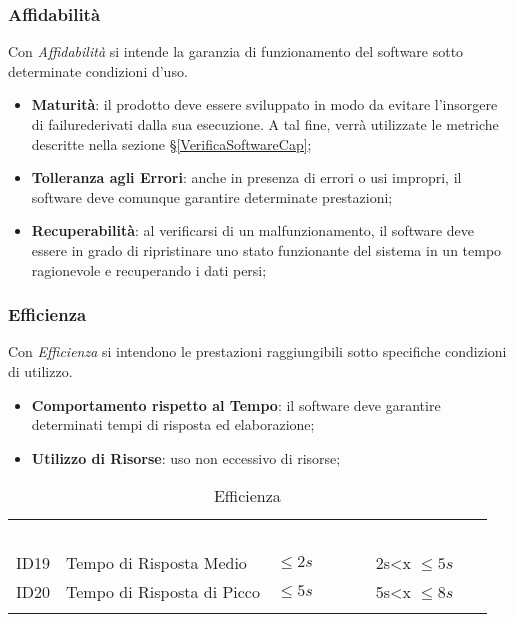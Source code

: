 \subsubsection{Affidabilità}

Con \textit{Affidabilità} si intende la garanzia di funzionamento del software sotto determinate condizioni d'uso. 

\begin{itemize}
	\item \textbf{Maturità}: il prodotto deve essere sviluppato in modo da evitare l'insorgere di failure\glossario derivati dalla sua esecuzione. A tal fine, verrà utilizzate le metriche descritte nella sezione §\ref{VerificaSoftwareCap};
	\item \textbf{Tolleranza agli Errori}: anche in presenza di errori o usi impropri, il software deve comunque garantire determinate prestazioni;
	\item \textbf{Recuperabilità}: al verificarsi di un malfunzionamento, il software deve essere in grado di ripristinare uno stato funzionante del sistema in un tempo ragionevole e recuperando i dati persi;
\end{itemize}


\subsubsection{Efficienza}

Con \textit{Efficienza} si intendono le prestazioni raggiungibili sotto specifiche condizioni di utilizzo. 

\begin{itemize}
	\item \textbf{Comportamento rispetto al Tempo}: il software deve garantire determinati tempi di risposta ed elaborazione;
	\item \textbf{Utilizzo di Risorse}: uso non eccessivo di risorse;
\end{itemize}


\iffalse

\begin{longtable}{|C{.15\textwidth}|C{.24\textwidth}|C{.24\textwidth}|C{.24\textwidth}|}
\hline
{}\textbf{\textcolor{white}{ID}} & \textbf{\textcolor{white}{Nome}} & \textbf{\textcolor{white}{Ottimalità}} & \textbf{\textcolor{white}{Accettabilità}}\\
ID19 & Tempo di Risposta Medio & $\leq 2s$ & 2s<x $\leq 5s$\\
\hline
{}ID20 & Tempo di Risposta di Picco  & $\leq 5s$ & 5s<x $\leq 8s$ \\ 
\hline
\caption{Efficienza}
\label{Efficienza}
\end{longtable}

